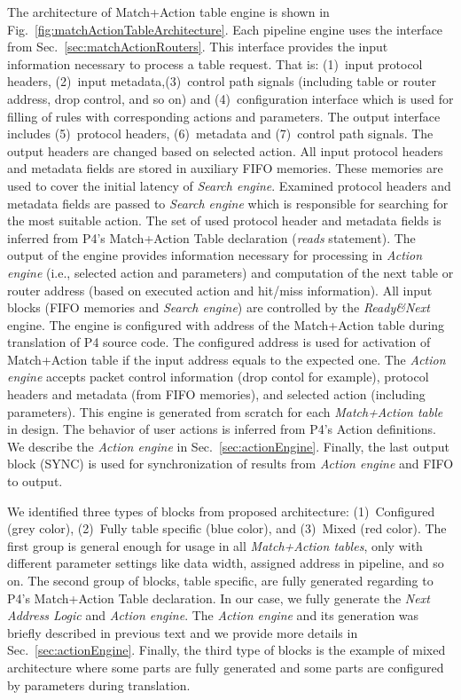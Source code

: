 The architecture of Match+Action table engine is shown in Fig.~\ref{fig:matchActionTableArchitecture}.
Each pipeline engine uses the interface from Sec.~\ref{sec:matchActionRouters}. 
This interface provides the input information necessary to process a table request. 
That is: (1)~input protocol headers, (2)~input metadata,(3)~control path signals (including table or router address, drop control, and so on)
and (4)~configuration interface which is used for filling of rules with corresponding actions and parameters. 
The output interface includes (5)~protocol headers, (6)~metadata and (7)~control path signals. 
The output headers are changed based on selected action. 
All input protocol headers and metadata fields are stored in auxiliary FIFO memories. 
These memories are used to cover the initial latency of \textit{Search engine}. 
Examined protocol headers and metadata fields are passed to \textit{Search engine} which is responsible for searching for the most suitable 
action. The set of used protocol header and metadata fields is inferred from P4's Match+Action Table declaration (\textit{reads} statement). 
The output of the engine provides information necessary for processing in \textit{Action engine} 
(i.e., selected action and parameters) and computation of the next table or router address (based on executed action and hit/miss information). 
All input blocks (FIFO memories and \textit{Search engine}) are controlled by the \textit{Ready\&Next} engine. 
The engine is configured with address of the Match+Action table during translation of P4 source code. 
The configured address is used for activation of Match+Action table if the input address equals to the expected one.
The \textit{Action engine} accepts packet control information (drop contol for example), protocol headers and metadata (from FIFO memories), 
and selected action (including parameters). 
This engine is generated from scratch for each \textit{Match+Action table} in design. 
The behavior of user actions is inferred from P4's Action definitions. 
We describe the \textit{Action engine} in Sec.~\ref{sec:actionEngine}. 
Finally, the last output block (SYNC) is used for synchronization of results from \textit{Action engine} and FIFO to output.

We identified three types of blocks from proposed architecture: 
(1)~Configured (grey color), (2)~Fully table specific (blue color), and (3)~Mixed (red color).
The first group is general enough for usage in all \textit{Match+Action tables}, only with different parameter settings like 
data width, assigned address in pipeline, and so on. 
The second group of blocks, table specific, are fully generated regarding to P4's Match+Action Table declaration. 
In our case, we fully generate the \textit{Next Address Logic} and \textit{Action engine}. 
The \textit{Action engine} and its generation was briefly described in previous text and we provide more details in 
Sec.~\ref{sec:actionEngine}.
Finally, the third type of blocks is the example of mixed architecture where some parts are fully generated and some parts are configured 
by parameters during translation.

